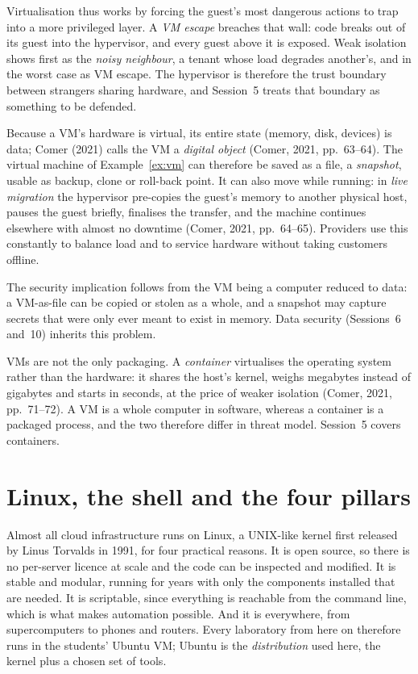 Virtualisation thus works by forcing the guest's most dangerous actions to
trap into a more privileged layer. A \emph{VM escape} breaches that wall:
code breaks out of its guest into the hypervisor, and every guest above it
is exposed. Weak isolation shows first as the \emph{noisy neighbour}, a
tenant whose load degrades another's, and in the worst case as VM escape.
The hypervisor is therefore the trust boundary between strangers sharing
hardware, and Session~5 treats that boundary as something to be defended.

\begin{example}\label{ex:migration}
Because a VM's hardware is virtual, its entire state (memory, disk, devices)
is data; Comer (2021) calls the VM a \emph{digital object} (Comer, 2021,
pp.~63--64). The virtual machine of Example~\ref{ex:vm} can therefore be saved
as a file, a \emph{snapshot}, usable as backup, clone or roll-back point. It can
also move while running: in \emph{live migration} the hypervisor pre-copies the
guest's memory to another physical host, pauses the guest briefly, finalises
the transfer, and the machine continues elsewhere with almost no downtime
(Comer, 2021, pp.~64--65). Providers use this constantly to balance load and to
service hardware without taking customers offline.

The security implication follows from the VM being a computer reduced to data: a
VM-as-file can be copied or stolen as a whole, and a snapshot may capture
secrets that were only ever meant to exist in memory. Data security
(Sessions~6 and~10) inherits this problem.
\end{example}

VMs are not the only packaging. A \emph{container} virtualises the operating
system rather than the hardware: it shares the host's kernel, weighs
megabytes instead of gigabytes and starts in seconds, at the price of weaker
isolation (Comer, 2021, pp.~71--72). A VM is a whole computer in software,
whereas a container is a packaged process, and the two therefore differ in
threat model. Session~5 covers containers.

\section{Linux, the shell and the four pillars}

Almost all cloud infrastructure runs on Linux, a UNIX-like kernel first
released by Linus Torvalds in 1991, for four practical reasons. It is open
source, so there is no per-server licence at scale and the code can be
inspected and modified. It is stable and modular, running for years with
only the components installed that are needed. It is scriptable, since
everything is reachable from the command line, which is what makes
automation possible. And it is everywhere, from supercomputers to phones and
routers. Every laboratory from here on therefore runs in the students'
Ubuntu VM; Ubuntu is the \emph{distribution} used here, the kernel plus a
chosen set of tools.

